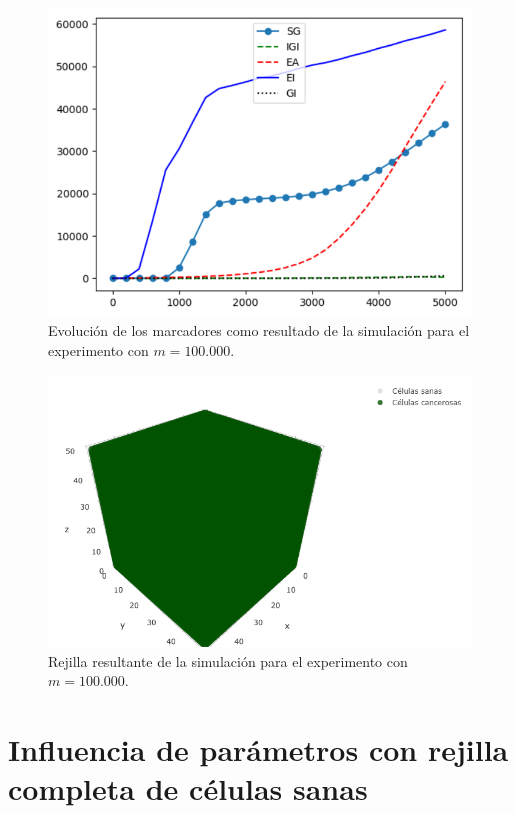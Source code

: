 \begin{figure}[h]
\centering
\includegraphics[scale=0.8]{figures/experiments/exp4/mutations}
\caption{Evolución de los marcadores como resultado de la simulación para el experimento con $m = 100.000$.}
\end{figure}

\begin{figure}[h]
\centering
\includegraphics[scale=0.6]{figures/experiments/exp4/grid}
\caption{Rejilla resultante de la simulación para el experimento con $m = 100.000$.}
\end{figure}

\section{Influencia de parámetros con rejilla completa de células sanas}

